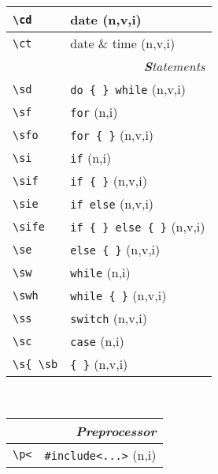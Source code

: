 \documentclass[oneside,10pt,landscape,DIV17]{scrartcl}
\begin{document}
\begin{multicols}{3}
\begin{center}
\begin{tabular}[]{|p{13mm}|p{56mm}|}
\hline \verb'\cd' & date                                    \hfill (n,v,i)\\
\hline \verb'\ct' & date \& time                            \hfill (n,v,i)\\
\hline 
\hline
\multicolumn{2}{|r|}{\textsl{\textbf{S}tatements}} \\
\hline \verb'\sd'  & \verb'do { } while'        \hfill (n,v,i)\\
\hline \verb'\sf'  & \verb'for'                 \hfill (n,i)\\
\hline \verb'\sfo' & \verb'for { }'             \hfill (n,v,i)\\
\hline \verb'\si'  & \verb'if'                  \hfill (n,i)\\
\hline \verb'\sif' & \verb'if { }'              \hfill (n,v,i)\\
\hline \verb'\sie' & \verb'if else'             \hfill (n,v,i)\\
\hline \verb'\sife'& \verb'if { } else { }'     \hfill (n,v,i)\\
\hline \verb'\se'  & \verb'else { }'            \hfill (n,v,i)\\
\hline \verb'\sw'  & \verb'while'               \hfill (n,i)\\
\hline \verb'\swh' & \verb'while { }'           \hfill (n,v,i)\\
\hline \verb'\ss'  & \verb'switch'              \hfill (n,v,i)\\
\hline \verb'\sc'  & \verb'case'                \hfill (n,i)\\
\hline \verb'\s{ \sb'  & \verb'{ }'                 \hfill (n,v,i)\\
\hline
\end{tabular}\\
%
%
\begin{tabular}[]{|p{11mm}|p{58mm}|}
\hline
\multicolumn{2}{|r|}{\textsl{\textbf{P}reprocessor}}   \\
\hline \verb'\p<'   & \verb$#include<...>$         \hfill (n,i)\\

\end{tabular}
\end{center}
\end{multicols}
\end{document}
